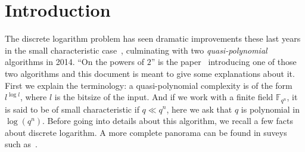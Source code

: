 \documentclass[a4paper,11pt]{article}
\title{}
\author{The powers-of-2 descent\\\textcolor{violet}{\textbf{Work in progress}}}
\theoremstyle{break}
\theoremstyle{sc}
\theoremstyle{definition}
\theoremstyle{remark}
\begin{document}
\maketitle





\section{Introduction}

The discrete logarithm problem has seen dramatic improvements these last
years in the small characteristic case~\cite{Joux13, BGJT13, GKZ14},
culminating with two \emph{quasi-polynomial} algorithms in 2014. ``On the powers
of $2$'' is the paper~\cite{GKZ14} introducing one of those two algorithms and this document is
meant to give some explanations about it. First we explain the
terminology: a quasi-polynomial complexity is of the form $l^{\log l}$, where
$l$ is the bitsize of the input. And if we work with a finite field
$\mathbb{F}_{q^n}$, it is said to be of small characteristic if $q\ll q^n$, here
we ask that $q$ is polynomial in $\log(q^n)$. Before going into details about this
algorithm, we recall a few facts about discrete logarithm. A more complete
panorama can be found in suveys such as~\cite{JP16, GKZ16}.
\end{document}
